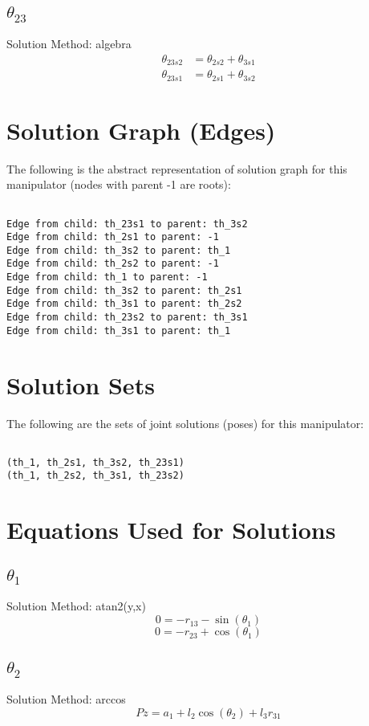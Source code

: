\subsection{$\theta_{23}$ }
Solution Method:  algebra
\begin{align}
\theta_{23s2} &= \theta_{2s2} + \theta_{3s1} \\
\theta_{23s1} &= \theta_{2s1} + \theta_{3s2} 
\end{align}
\section{Solution Graph (Edges)}

    The following is the abstract representation of solution graph for this manipulator (nodes with parent -1 are roots):
    \begin{verbatim}
    
Edge from child: th_23s1 to parent: th_3s2
Edge from child: th_2s1 to parent: -1
Edge from child: th_3s2 to parent: th_1
Edge from child: th_2s2 to parent: -1
Edge from child: th_1 to parent: -1
Edge from child: th_3s2 to parent: th_2s1
Edge from child: th_3s1 to parent: th_2s2
Edge from child: th_23s2 to parent: th_3s1
Edge from child: th_3s1 to parent: th_1
\end{verbatim}
\section{Solution Sets}

    The following are the sets of joint solutions (poses) for this manipulator:
    \begin{verbatim}
    
(th_1, th_2s1, th_3s2, th_23s1)
(th_1, th_2s2, th_3s1, th_23s2)
\end{verbatim}
\section{Equations Used for Solutions}
\subsection{$\theta_{1}$ }
Solution Method:  atan2(y,x)
\begin{dmath}
0 = - r_{13} - \sin{\left (\theta_{1} \right )}
\end{dmath}
\begin{dmath}
0 = - r_{23} + \cos{\left (\theta_{1} \right )}
\end{dmath}
\subsection{$\theta_{2}$ }
Solution Method:  arccos
\begin{dmath}
Pz = a_{1} + l_{2} \cos{\left (\theta_{2} \right )} + l_{3} r_{31}
\end{dmath}
